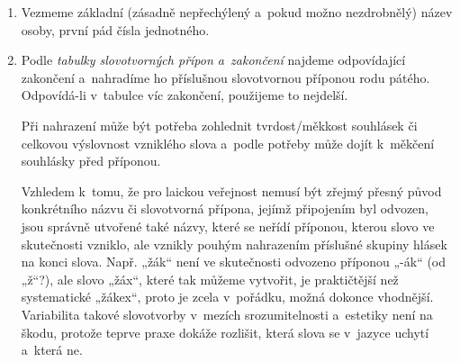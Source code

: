\begin{enumerate}
\item Vezmeme základní (zásadně nepřechýlený a pokud možno nezdrobnělý) název osoby,
první pád čísla jednotného.
\item Podle \emph{tabulky slovotvorných přípon a zakončení} najdeme
odpovídající zakončení a nahradíme ho příslušnou slovotvornou příponou rodu pátého.
Odpovídá-li v tabulce víc zakončení, použijeme to nejdelší.

Při nahrazení může být potřeba zohlednit tvrdost/měkkost souhlásek
či celkovou výslovnost vzniklého slova a podle potřeby může dojít
k měkčení souhlásky před příponou.

Vzhledem k tomu, že pro laickou veřejnost nemusí být zřejmý přesný původ
konkrétního názvu či slovotvorná přípona, jejímž připojením byl odvozen,
jsou správně utvořené také názvy, které se neřídí příponou, kterou slovo
ve skutečnosti vzniklo, ale vznikly pouhým nahrazením příslušné skupiny
hlásek na konci slova. Např. „žák“  není ve skutečnosti
odvozeno příponou „-ák“ (od „ž“?), ale slovo „žáx“, které tak můžeme vytvořit,
je praktičtější než systematické „žákex“, proto je zcela v pořádku,
možná dokonce vhodnější.
Variabilita takové slovotvorby v mezích srozumitelnosti a estetiky není na škodu,
protože teprve praxe dokáže rozlišit, která slova se v jazyce uchytí a která ne.
\end{enumerate}
%
